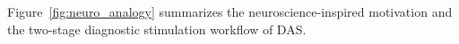 Figure~\ref{fig:neuro_analogy} summarizes the neuroscience-inspired motivation and the two-stage diagnostic stimulation workflow of DAS.

